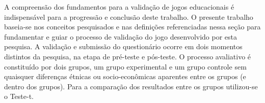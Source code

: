 
\vspace{-0.1cm}

A compreensão dos fundamentos para a validação de jogos educacionais é indispensável para a progressão e conclusão deste trabalho. O presente trabalho baseia-se nos conceitos pesquisados e nas definições referenciadas nessa seção para fundamentar e guiar o processo de validação do jogo desenvolvido por esta pesquisa. A validação e submissão do questionário ocorre em dois momentos distintos da pesquisa, na etapa de pré-teste e pós-teste. O processo avaliativo é constituído por dois grupos, um grupo experimental e um grupo controle sem quaisquer diferenças étnicas ou socio-econômicas aparentes entre os grupos (e dentro dos grupos). Para a comparação dos resultados entre os grupos utilizou-se o Teste-t. 




